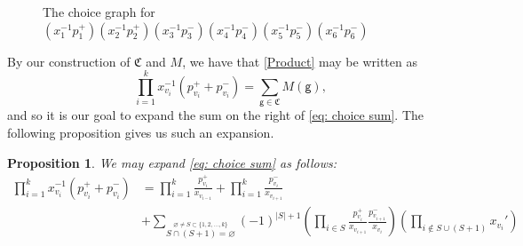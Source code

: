 \documentclass[10pt]{amsart}
\numberwithin{equation}{section}
\newtheorem{prop}[thm]{Proposition}
\theoremstyle{definition}
\theoremstyle{remark}
\renewcommand{\emptyset}{\varnothing}
\newcommand{\1}{^{-1}}
\begin{document}
\begin{figure}
\caption{The choice graph for $(x_{1}\1 p_{1}^+)(x_{2}\1 p_{2}^+)(x_{3}\1 p_{3}^-)(x_{4}\1 p_{4}^-)(x_{5}\1 p_{5}^-)(x_{6}\1 p_{6}^-)$}
\label{fig: choice graph}
\end{figure}
By our construction of $\mathfrak C$ and $M$, we have that \eqref{Product} may be written as
\begin{equation}\label{eq: choice sum}
\prod_{i=1}^k x_{v_i}\1 (p_{v_i}^+ + p_{v_i}^-) = \sum_{\mathsf g \in \mathfrak C} M(\mathsf g),
\end{equation}
and so it is our goal to expand the sum on the right of \eqref{eq: choice sum}. The following proposition gives us such an expansion.
\begin{prop}\label{cycle}
We may expand \eqref{eq: choice sum} as follows:
\begin{align}\label{cyclerel-eq}
\prod_{i=1}^k x_{v_i}\1 (p_{v_i}^+ + p_{v_i}^-) 
&= \prod_{i=1}^k \frac{p_{v_i}^+}{x_{v_{i-1}}} + \prod_{i=1}^k \frac{p_{v_i}^-}{x_{v_{i+1}}} \nonumber\\
&+ \sum_{\stackrel{\emptyset \neq S\subset \{1,2,\dots,k\}}{S\cap (S+1)=\emptyset}}(-1)^{|S|+1} \left(\prod_{i\in S} \frac{p_{v_i}^+}{x_{v_{i+1}}}\frac{p_{v_{i+1}}^-}{x_{v_i}}\right) \left(\prod_{i \notin S \cup (S+1)} x_{v_i}'\right)
\end{align}
\end{prop}
\end{document}
